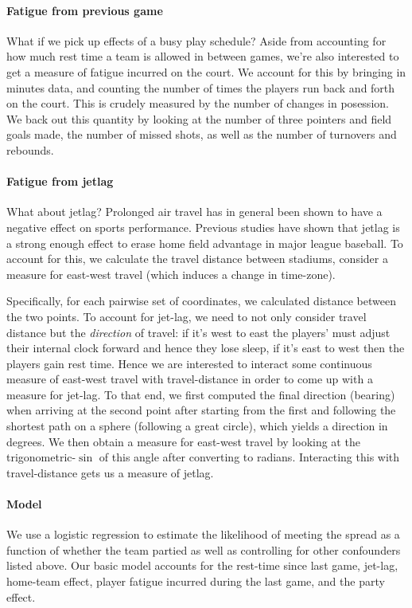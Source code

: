 \documentclass[letterpaper,12pt]{article}
\begin{document}
\paragraph{Fatigue from previous game}
What if we pick up effects of a busy play schedule?
Aside from accounting for how much rest time a team is allowed in between games,
we're also interested to get a measure of
fatigue incurred on the court.
We account for this by bringing in minutes data, and counting the number of 
times the players run back and forth on the court. This is crudely measured
by the number of changes in posession. We back out this quantity by looking
at the number of three pointers and field goals made, the number of missed shots,
as well as the number of turnovers and rebounds.

\paragraph{Fatigue from jetlag}
What about jetlag? Prolonged air travel has in general been shown
to have a negative effect on sports performance.\citep{leeandgalvez}
Previous studies have shown that jetlag is a strong enough effect
to erase home field advantage in major league baseball.\citep{songetal}
To account for this, we calculate the travel distance between stadiums,
consider a measure for east-west travel (which induces a change in time-zone).

Specifically, for each pairwise set of coordinates, we calculated distance between the two
points.\citep{sp} To account for jet-lag, we need to not only consider travel distance
but the \emph{direction} of travel: if it's west to east the players' must adjust their internal
clock forward and hence they lose sleep, if it's east to west then the players gain rest time.
Hence we are interested to interact some continuous measure of east-west travel with
travel-distance in order to come up with a measure for jet-lag.
To that end, we first computed the final direction 
(bearing) when arriving at the 
second point after starting from the first and following the shortest path on a sphere 
(following a great circle), which yields a direction in degrees. 
We then obtain a measure for east-west travel by looking at the trigonometric-$\sin$ of this angle after converting to radians.
Interacting this with travel-distance gets us a measure of jetlag.\citep{lallensack}


\paragraph{Model} We use a logistic regression to estimate the likelihood of meeting
the spread as a function of whether the team partied as well as controlling for other confounders
listed above. Our basic model accounts for the rest-time since
last game, jet-lag, home-team effect, player fatigue incurred during the last game, and the party effect.
\end{document}
